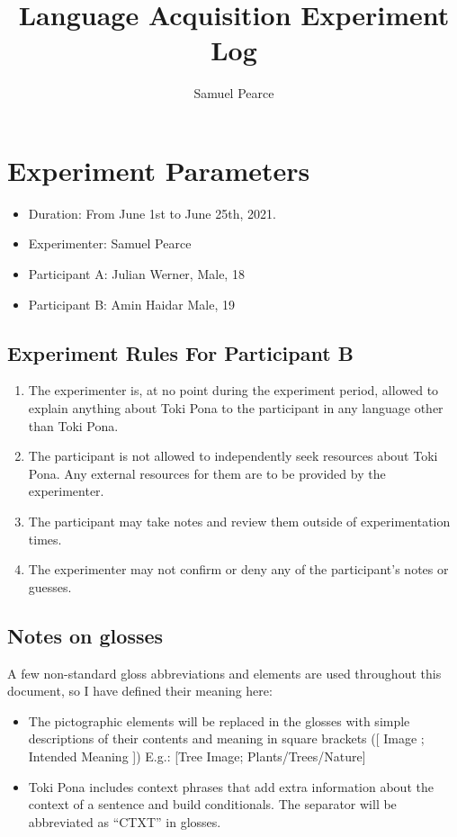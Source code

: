 \documentclass[a4paper,10pt]{article}
\title{Language Acquisition Experiment Log}
\author{Samuel Pearce}
\begin{document}
\maketitle

\tableofcontents

\pagebreak

\section{Experiment Parameters}

\begin{itemize}
 \item Duration:        From June 1st to June 25th, 2021.
 \item Experimenter:    Samuel Pearce
 \item Participant A:   Julian Werner, Male, 18
 \item Participant B:   Amin Haidar Male, 19
\end{itemize}


\subsection{Experiment Rules For Participant B}
\begin{enumerate}
 \item The experimenter is, at no point during the experiment period,
 allowed to explain anything about Toki Pona to the participant in
 any language other than Toki Pona.
 \item The participant is not allowed to independently seek resources
 about Toki Pona. Any external resources for them are to be provided by
 the experimenter.
 \item The participant may take notes and review them outside of
 experimentation times.
 \item The experimenter may not confirm or deny
 any of the participant's notes or guesses.
\end{enumerate}

\subsection{Notes on glosses}
A few non-standard gloss abbreviations and elements are used
throughout this document, so I have defined their meaning here:
\begin{itemize}
 \item The pictographic
 elements will be replaced in the glosses with simple descriptions of their
 contents and meaning in square brackets ([ Image ; Intended Meaning ])
 E.g.: [Tree Image; Plants/Trees/Nature]
 \item Toki Pona includes context phrases that add extra information
 about the context of a sentence and build conditionals. The separator
 will be abbreviated as ``CTXT'' in glosses.
\end{itemize}
\end{document}
